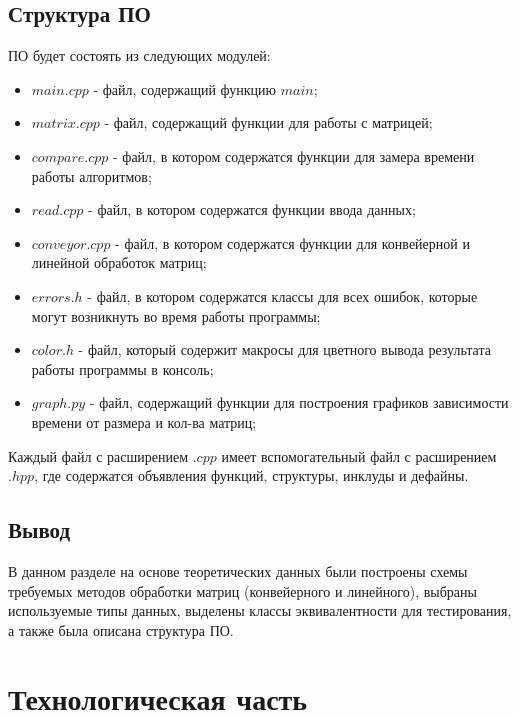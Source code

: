 \documentclass[a4paper,14pt, unknownkeysallowed]{extreport}
\begin{document}
\clearpage

\section{Структура ПО}

ПО будет состоять из следующих модулей:

\begin{itemize}
	\item $main.cpp$ - файл, содержащий функцию $main$;
    \item $matrix.cpp$ - файл, содержащий функции для работы с матрицей;
    \item $compare.cpp$ - файл, в котором содержатся функции для замера времени работы алгоритмов;
    \item $read.cpp$ - файл, в котором содержатся функции ввода данных;
    \item $conveyor.cpp$ - файл, в котором содержатся функции для конвейерной и линейной обработок матриц;
    \item $errors.h$ - файл, в котором содержатся классы для всех ошибок, которые могут возникнуть во время работы программы;
    \item $color.h$ - файл, который содержит макросы для цветного вывода результата работы программы в консоль;
    \item $graph.py$ - файл, содержащий функции для построения графиков зависимости времени от размера и кол-ва матриц;
\end{itemize}

Каждый файл с расширением $.cpp$ имеет вспомогательный файл с расширением $.hpp$, где содержатся объявления функций, структуры, инклуды и дефайны.

\section{Вывод}

В данном разделе на основе теоретических данных были построены схемы требуемых методов обработки матриц (конвейерного и линейного), выбраны используемые типы данных, выделены классы эквивалентности для тестирования, а также была описана структура ПО.

\clearpage





\chapter{Технологическая часть}
\end{document}
